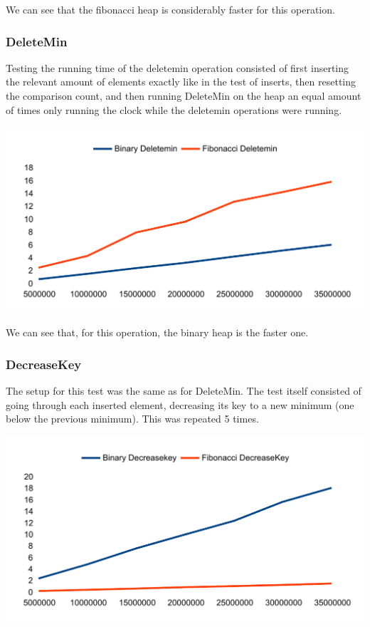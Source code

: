 We can see that the fibonacci heap is considerably faster for this operation.

\subsubsection{DeleteMin}
Testing the running time of the deletemin operation consisted of first inserting the relevant amount of elements exactly like in the test of inserts, then resetting the comparison count, and then running DeleteMin on the heap an equal amount of times only running the clock while the deletemin operations were running.

\includegraphics[width=\textwidth]{graphs/deletemin_graph.pdf}

We can see that, for this operation, the binary heap is the faster one.

\subsubsection{DecreaseKey}
The setup for this test was the same as for DeleteMin. The test itself consisted of going through each inserted element, decreasing its key to a new minimum (one below the previous minimum). This was repeated 5 times.

\includegraphics[width=\textwidth]{graphs/decreasekey_graph.pdf}

